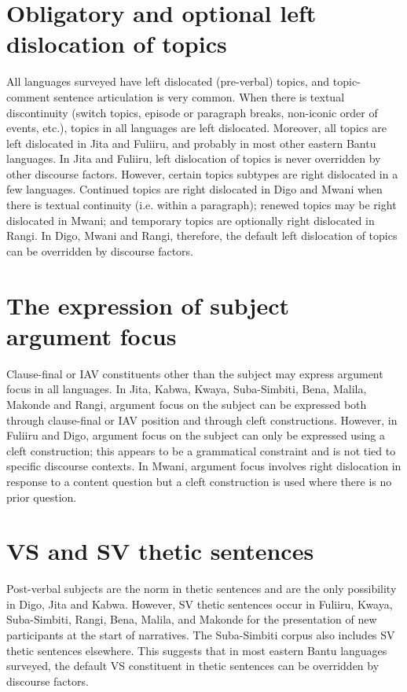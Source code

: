 \documentclass[output=paper]{langsci/langscibook}
\begin{document}
\section{Obligatory and optional left dislocation of topics}

All languages surveyed have left dislocated (pre-verbal) topics, and topic-comment sentence articulation is very common. When there is textual discontinuity (switch topics, episode or paragraph breaks, non-iconic order of events, etc.), topics in all languages are left dislocated. Moreover, all topics are left dislocated in Jita and Fuliiru, and probably in most other eastern Bantu languages. In Jita and Fuliiru, left dislocation of topics is never overridden by other discourse factors. However, certain topics subtypes are right dislocated in a few languages. Continued topics are right dislocated in Digo and Mwani when there is textual continuity (i.e. within a paragraph); renewed topics may be right dislocated in Mwani; and temporary topics are optionally right dislocated in Rangi. In Digo, Mwani and Rangi, therefore, the default left dislocation of topics can be overridden by discourse factors.

\section{The expression of subject argument focus}

Clause-final or IAV constituents other than the subject may express argument focus in all languages. In Jita, Kabwa, Kwaya, Suba-Simbiti, Bena, Malila, Makonde and Rangi, argument focus on the subject can be expressed both through clause{}-final or IAV position and through cleft constructions. However, in Fuliiru and Digo, argument focus on the subject can only be expressed using a cleft construction; this appears to be a grammatical constraint and is not tied to specific discourse contexts. In Mwani, argument focus involves right dislocation in response to a content question but a cleft construction is used where there is no prior question.

\section{VS and SV thetic sentences}

Post-verbal subjects are the norm in thetic sentences and are the only possibility in Digo, Jita and Kabwa. However, SV thetic sentences occur in Fuliiru, Kwaya, Suba-Simbiti, Rangi, Bena, Malila, and Makonde for the presentation of new participants at the start of narratives. The Suba-Simbiti corpus also includes SV thetic sentences elsewhere. This suggests that in most eastern Bantu languages surveyed, the default VS constituent in thetic sentences can be overridden by discourse factors.
\end{document}
